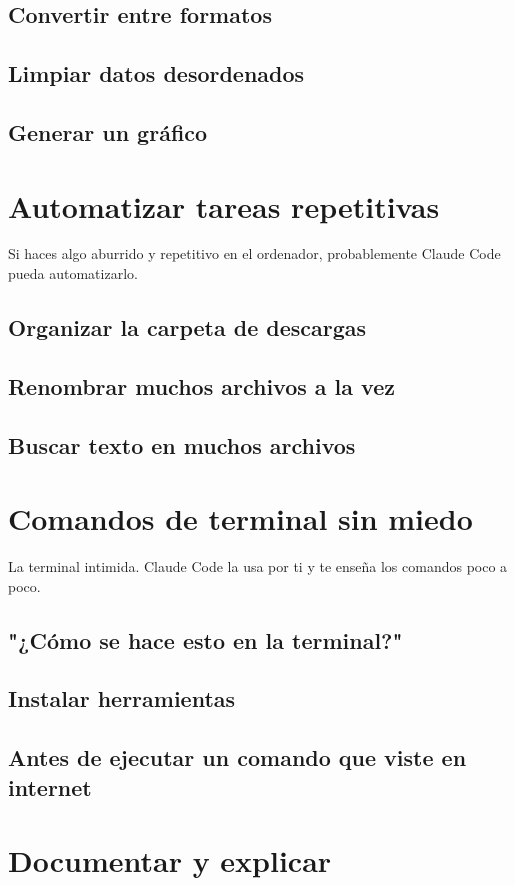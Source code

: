 \documentclass[11pt,a4paper]{book}
\begin{document}
\subsection{Convertir entre formatos}
\subsection{Limpiar datos desordenados}
\subsection{Generar un gráfico}
\section{Automatizar tareas repetitivas}
Si haces algo aburrido y repetitivo en el ordenador, probablemente Claude Code pueda automatizarlo.

\subsection{Organizar la carpeta de descargas}
\subsection{Renombrar muchos archivos a la vez}
\subsection{Buscar texto en muchos archivos}
\section{Comandos de terminal sin miedo}
La terminal intimida. Claude Code la usa por ti y te enseña los comandos poco a poco.

\subsection{"¿Cómo se hace esto en la terminal?"}
\subsection{Instalar herramientas}
\subsection{Antes de ejecutar un comando que viste en internet}
\section{Documentar y explicar}
\end{document}
